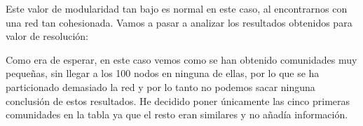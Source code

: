 Este valor de modularidad tan bajo es normal en este caso, al encontrarnos con una red tan cohesionada. Vamos a pasar a analizar los resultados obtenidos para valor de resolución:


\begin{table}[H]
\centering
{}
\caption{Primeras cinco comunidades obtenidas para un valor de resolución de $0.25$.}
\end{table}

Como era de esperar, en este caso vemos como se han obtenido comunidades muy pequeñas, sin llegar a los 100 nodos en ninguna de ellas, por lo que se ha particionado demasiado la red y por lo tanto no podemos sacar ninguna conclusión de estos resultados. He decidido poner únicamente las cinco primeras comunidades en la tabla ya que el resto eran similares y no añadía información.


